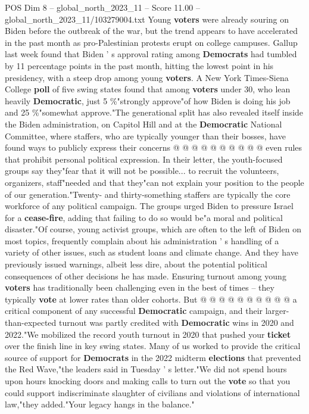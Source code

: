 \begin{textsample}{POS Dim 8 – global\_north\_2023\_11 – Score 11.00 – global\_north\_2023\_11/103279004.txt}
Young \textbf{voters} were already souring on Biden before the outbreak of the war, but the trend appears to have accelerated in the past month as pro-Palestinian protests erupt on college campuses.
Gallup last week found that Biden ' s approval rating among \textbf{Democrats} had tumbled by 11 percentage points in the past month, hitting the lowest point in his presidency, with a steep drop among young \textbf{voters}.
A New York Times-Siena College \textbf{poll} of five swing states found that among \textbf{voters} under 30, who lean heavily \textbf{Democratic}, just 5 \%"strongly approve"of how Biden is doing his job and 25 \%"somewhat approve."The generational split has also revealed itself inside the Biden administration, on Capitol Hill and at the \textbf{Democratic} National Committee, where staffers, who are typically younger than their bosses, have found ways to publicly express their concerns @ @ @ @ @ @ @ @ @ @ even rules that prohibit personal political expression.
In their letter, the youth-focused groups say they"fear that it will not be possible... to recruit the volunteers, organizers, staff"needed and that they"can not explain your position to the people of our generation."Twenty- and thirty-something staffers are typically the core workforce of any political campaign.
The groups urged Biden to pressure Israel for a \textbf{cease-fire}, adding that failing to do so would be"a moral and political disaster."Of course, young activist groups, which are often to the left of Biden on most topics, frequently complain about his administration ' s handling of a variety of other issues, such as student loans and climate change.
And they have previously issued warnings, albeit less dire, about the potential political consequences of other decisions he has made.
Ensuring turnout among young \textbf{voters} has traditionally been challenging even in the best of times -- they typically \textbf{vote} at lower rates than older cohorts.
But @ @ @ @ @ @ @ @ @ @ a critical component of any successful \textbf{Democratic} campaign, and their larger-than-expected turnout was partly credited with \textbf{Democratic} wins in 2020 and 2022."We mobilized the record youth turnout in 2020 that pushed your \textbf{ticket} over the finish line in key swing states.
Many of us worked to provide the critical source of support for \textbf{Democrats} in the 2022 midterm \textbf{elections} that prevented the Red Wave,"the leaders said in Tuesday ' s letter."We did not spend hours upon hours knocking doors and making calls to turn out the \textbf{vote} so that you could support indiscriminate slaughter of civilians and violations of international law,"they added."Your legacy hangs in the balance."

\end{textsample}
